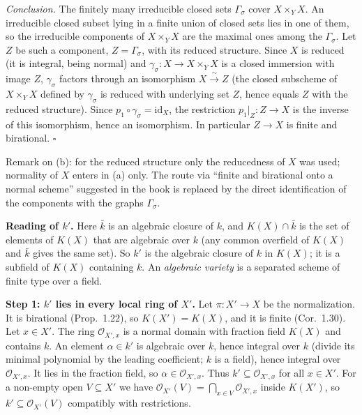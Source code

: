\documentclass[11pt]{article}
\begin{document}
\emph{Conclusion.} The finitely many irreducible closed sets $\Gamma_\sigma$ cover $X\times_YX$. An irreducible closed subset lying in a finite union of closed sets lies in one of them, so the irreducible components of $X\times_YX$ are the maximal ones among the $\Gamma_\sigma$. Let $Z$ be such a component, $Z=\Gamma_\sigma$, with its reduced structure. Since $X$ is reduced (it is integral, being normal) and $\gamma_\sigma:X\to X\times_YX$ is a closed immersion with image $Z$, $\gamma_\sigma$ factors through an isomorphism $X\xrightarrow{\ \sim\ }Z$ (the closed subscheme of $X\times_YX$ defined by $\gamma_\sigma$ is reduced with underlying set $Z$, hence equals $Z$ with the reduced structure). Since $p_1\circ\gamma_\sigma=\mathrm{id}_X$, the restriction $p_1|_Z:Z\to X$ is the inverse of this isomorphism, hence an isomorphism. In particular $Z\to X$ is finite and birational. \hfill$\square$

Remark on (b): for the reduced structure only the reducedness of $X$ was used; normality of $X$ enters in (a) only. The route via ``finite and birational onto a normal scheme'' suggested in the book is replaced by the direct identification of the components with the graphs $\Gamma_\sigma$.

\pf
\textbf{Reading of $k'$.} Here $\bar k$ is an algebraic closure of $k$, and $K(X)\cap\bar k$ is the set of elements of $K(X)$ that are algebraic over $k$ (any common overfield of $K(X)$ and $\bar k$ gives the same set). So $k'$ is the algebraic closure of $k$ in $K(X)$; it is a subfield of $K(X)$ containing $k$. An \emph{algebraic variety} is a separated scheme of finite type over a field.

\textbf{Step 1: $k'$ lies in every local ring of $X'$.} Let $\pi:X'\to X$ be the normalization. It is birational (Prop.~1.22), so $K(X')=K(X)$, and it is finite (Cor.~1.30). Let $x\in X'$. The ring $\mathcal O_{X',x}$ is a normal domain with fraction field $K(X)$ and contains $k$. An element $\alpha\in k'$ is algebraic over $k$, hence integral over $k$ (divide its minimal polynomial by the leading coefficient; $k$ is a field), hence integral over $\mathcal O_{X',x}$. It lies in the fraction field, so $\alpha\in\mathcal O_{X',x}$. Thus $k'\subseteq\mathcal O_{X',x}$ for all $x\in X'$. For a non-empty open $V\subseteq X'$ we have $\mathcal O_{X'}(V)=\bigcap_{x\in V}\mathcal O_{X',x}$ inside $K(X')$, so $k'\subseteq\mathcal O_{X'}(V)$ compatibly with restrictions.
\end{document}
